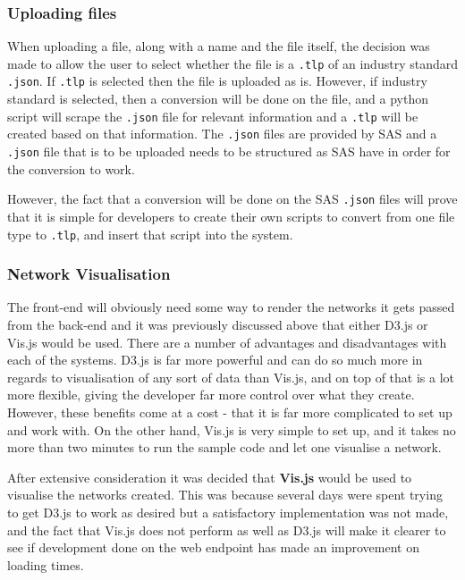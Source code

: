 \documentclass[../dissertation.tex]{subfiles}
\begin{document}
\subsubsection{Uploading files}

When uploading a file, along with a name and the file itself, the decision was made to allow the user to select whether the file is a \texttt{.tlp} of an industry standard \texttt{.json}. If \texttt{.tlp} is selected then the file is uploaded as is. However, if industry standard is selected, then a conversion will be done on the file, and a python script will scrape the \texttt{.json} file for relevant information and a \texttt{.tlp} will be created based on that information. The \texttt{.json} files are provided by SAS and a \texttt{.json} file that is to be uploaded needs to be structured as SAS have in order for the conversion to work. 

However, the fact that a conversion will be done on the SAS \texttt{.json} files will prove that it is simple for developers to create their own scripts to convert from one file type to \texttt{.tlp}, and insert that script into the system.

\subsubsection{Network Visualisation}

The front-end will obviously need some way to render the networks it gets passed from the back-end and it was previously discussed above that either D3.js or Vis.js would be used. There are a number of advantages and disadvantages with each of the systems. D3.js is far more powerful and can do so much more in regards to visualisation of any sort of data than Vis.js, and on top of that is a lot more flexible, giving the developer far more control over what they create. However, these benefits come at a cost - that it is far more complicated to set up and work with. On the other hand, Vis.js is very simple to set up, and it takes no more than two minutes to run the sample code and let one visualise a network. 

After extensive consideration it was decided that \textbf{Vis.js} would be used to visualise the networks created. This was because several days were spent trying to get D3.js to work as desired but a satisfactory implementation was not made, and the fact that Vis.js does not perform as well as D3.js will make it clearer to see if development done on the web endpoint has made an improvement on loading times.
\end{document}
